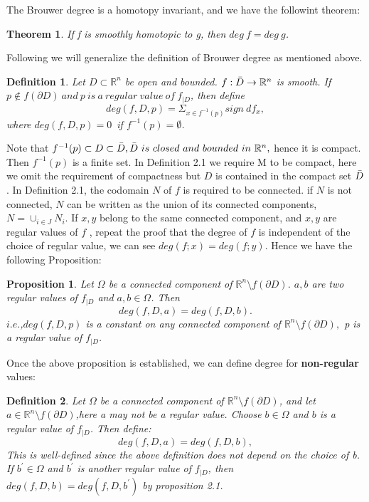 \documentclass[11pt]{article}
\newtheorem{theorem}{Theorem}
\newtheorem{definition}{Definition}
\newtheorem{proposition}{Proposition}
\numberwithin{equation}{section} \numberwithin{theorem}{section}
\numberwithin{lemma}{section} \numberwithin{remark}{section}
\numberwithin{table}{section} \numberwithin{corollary}{section}
\numberwithin{example}{section} \numberwithin{conjecture}{section}
\numberwithin{assumption}{section}
\numberwithin{definition}{section}
\numberwithin{proposition}{section}
\renewcommand{\o}{\emptyset}
\begin{document}
The Brouwer degree is a homotopy invariant, and we have the followint theorem:
\begin{theorem}\cite[$\S 5 \ Theorem B$]{milnor1997topology}
   If f is smoothly homotopic to g, then $deg\ f = deg \ g$.
\end{theorem}
Following we will generalize the definition of Brouwer degree as mentioned above. 
\begin{definition}\cite[$\S 1.2$]{cho2006topological}
Let $D \subset \mathbb{R}^n$ be open and bounded. $f:\Bar{D}\rightarrow \mathbb{R}^n$ is smooth. If $p \notin f(\partial D) \ and\  p\  is\  a \ regular \ value \ of\  f_{|D}$, then define 
\begin{equation}
    deg(f,D,p)=\Sigma_{x\in f^{-1}(p)} sign \ df_x,
\end{equation}
where $deg(f,D,p)=0$\ if $f^{-1}(p)=\o$.
\end{definition}
Note that $f^{-1}(p) \subset D \subset \Bar{D}, \Bar{D} \ is\  closed\  and\  bounded\  in\  \mathbb{R}^n,$ hence it is compact. Then $f^{-1}(p)$ is a finite set. In Definition 2.1 we require M to be compact, here we omit the requirement of compactness but $D $ is contained in the compact set $\Bar{D}$. In Definition 2.1, the codomain $N$ of $f$ is required to be connected. if $N$ is not connected, $N$ can be written as the union of its connected components, $N=\cup _{i\in J}N_i$. If $x,y$ belong to  the same connected component, and $x,y$ are regular values of $f$ , repeat the proof that the degree of $f$  is independent of the choice of regular value, we can see $deg(f;x)=deg(f;y)$. Hence we have the following Proposition:
\begin{proposition}
    Let $\Omega$ be a connected component of $ \mathbb{R}^n \setminus f(\partial D )$. $a,b$ are two regular values of $f_{|D}$ and $a,b \in \Omega$. Then 
    \begin{equation*}
        deg(f,D,a)=deg(f,D,b).
    \end{equation*}
$i.e.$,$deg(f,D,p)$ is a constant on any connected component of $ \mathbb{R}^n \setminus f(\partial D ),$
p is  a  regular  value  of $f_{|D}$.
\end{proposition}
Once the above proposition is established, we can define degree for \textbf{non-regular } values:
\begin{definition}
 Let $\Omega$ be a connected component of $ \mathbb{R}^n \setminus f(\partial D )$, and let $a\in \mathbb{R}^n\setminus f(\partial D )$,here a may not be a regular value. Choose $b\in \Omega$ and $b$ is a regular value  of $f_{|D}$. Then define:
 \begin{equation}
     deg(f,D,a)=deg(f,D,b),
 \end{equation}
 This is well-defined since the above definition does not depend on the choice of b. If  $b^{'} \in \Omega$ and  $b^'$ is another regular value  of $f_{|D}$, then $ deg(f,D,b)=deg(f,D,b^')$ by proposition 2.1. 
\end{definition}
\end{document}
